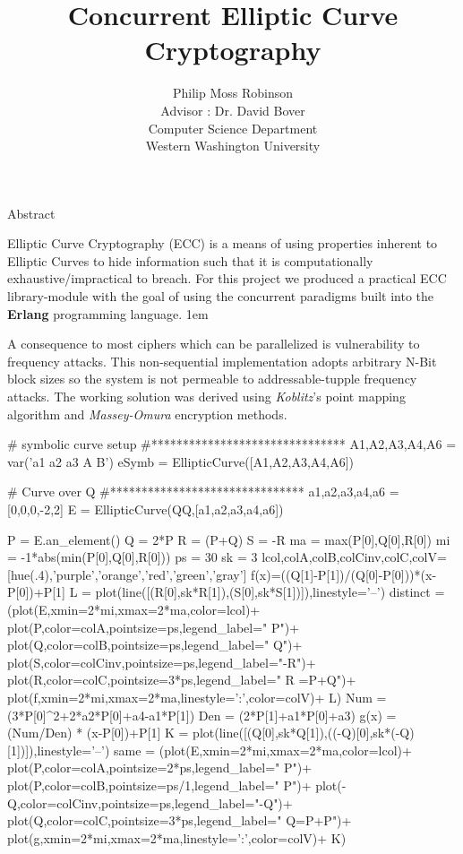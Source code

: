 \documentclass[a0,portrait]{a0poster}
\title{Concurrent Elliptic Curve Cryptography}
\author{Philip Moss Robinson \\ Advisor : Dr. David Bover\\Computer Science Department\\Western Washington University}
\begin{document}
\maketitle

\begin{multicols}{2}
\begin{slide}{Abstract}

Elliptic Curve Cryptography (ECC) is a means of using properties inherent to Elliptic Curves to hide information such that it is computationally exhaustive/impractical to breach. For this project we produced a practical ECC library-module with the goal of using the concurrent paradigms built into the {\bf Erlang} programming language.
\parskip 1em


A consequence to most ciphers which can be parallelized is vulnerability to frequency attacks. This non-sequential implementation adopts arbitrary N-Bit block sizes so the system is not permeable to addressable-tupple frequency attacks. The working solution was derived using {\em Koblitz}’s point mapping algorithm and {\em Massey-Omura} encryption methods.

\end{slide}



\begin{sagesilent}

# symbolic curve setup
#*******************************
A1,A2,A3,A4,A6 = var('a1 a2 a3 A B')
eSymb = EllipticCurve([A1,A2,A3,A4,A6])

# Curve over Q
#*******************************
a1,a2,a3,a4,a6 = [0,0,0,-2,2]
E = EllipticCurve(QQ,[a1,a2,a3,a4,a6])

P = E.an_element()
Q = 2*P
R = (P+Q)
S = -R
ma = max(P[0],Q[0],R[0])
mi = -1*abs(min(P[0],Q[0],R[0]))
ps = 30
sk = 3
lcol,colA,colB,colCinv,colC,colV=[hue(.4),'purple','orange','red','green','gray']
f(x)=((Q[1]-P[1])/(Q[0]-P[0]))*(x-P[0])+P[1]
L = plot(line([(R[0],sk*R[1]),(S[0],sk*S[1])]),linestyle='--')
distinct = (plot(E,xmin=2*mi,xmax=2*ma,color=lcol)+
            plot(P,color=colA,pointsize=ps,legend_label=" P")+
            plot(Q,color=colB,pointsize=ps,legend_label=" Q")+
            plot(S,color=colCinv,pointsize=ps,legend_label="-R")+
            plot(R,color=colC,pointsize=3*ps,legend_label=" R =P+Q")+
            plot(f,xmin=2*mi,xmax=2*ma,linestyle=':',color=colV)+
            L)
Num = (3*P[0]^2+2*a2*P[0]+a4-a1*P[1])
Den = (2*P[1]+a1*P[0]+a3)
g(x) = (Num/Den) * (x-P[0])+P[1]    
K = plot(line([(Q[0],sk*Q[1]),((-Q)[0],sk*(-Q)[1])]),linestyle='--')
same = (plot(E,xmin=2*mi,xmax=2*ma,color=lcol)+
        plot(P,color=colA,pointsize=2*ps,legend_label=" P")+
        plot(P,color=colB,pointsize=ps/1,legend_label=" P")+
        plot(-Q,color=colCinv,pointsize=ps,legend_label="-Q")+
        plot(Q,color=colC,pointsize=3*ps,legend_label=" Q=P+P")+
        plot(g,xmin=2*mi,xmax=2*ma,linestyle=':',color=colV)+
        K)        
\end{sagesilent}


\end{multicols}
\end{document}
